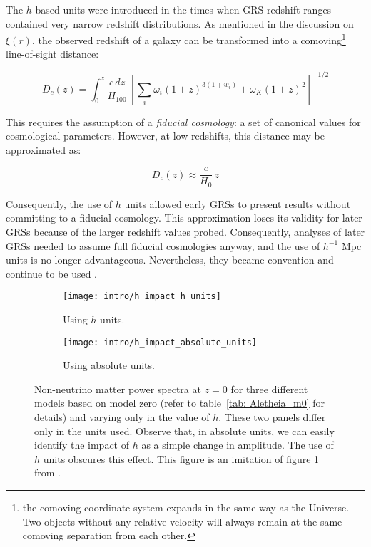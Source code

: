 The $h$-based units were introduced in the times when GRS redshift 
ranges contained very narrow redshift distributions. As mentioned in the
discussion on $\xi(r)$, the observed redshift of a galaxy can be transformed
into a comoving\footnote{the comoving coordinate system expands in the same
way as the Universe. Two objects without any relative velocity will always
remain at the same comoving separation from each other.} line-of-sight 
distance:

\begin{equation}
D_c (z)
=
\int_0^z \frac{c \, dz}{H_{100}}
\,
\left[
	\sum_i \omega_i (1 + z)^{3(1 + w_i)}
	+
	\omega_K (1 + z)^2
\right]^{-1/2}
\end{equation}

This requires the assumption of a \textit{fiducial cosmology}: a set of 
canonical values for cosmological parameters. However, at low
redshifts, this distance may be approximated as:

\begin{equation}
\label{eq: comov_dist_approx}
D_c(z) \approx \frac{c}{H_0} \, z
\end{equation}

Consequently, the use of $h$ units allowed early GRSs to present results
without committing to a fiducial cosmology. This
approximation loses its validity for later GRSs because of the larger redshift
values probed. Consequently, analyses of later GRSs needed to assume full 
fiducial cosmologies anyway, and the use of $h^{-1}$ Mpc units is no longer
advantageous. Nevertheless, they became convention and continue to be used 
.

\begin{figure}[ht!]
    \begin{subfigure}{0.45 \textwidth}
    \centering
 		\texttt{[image: intro/h\_impact\_h\_units]}
 		\caption{Using $h$ units.}
 		\label{fig: h_units}
    \end{subfigure}
    \begin{subfigure}{0.45 \textwidth}
    \centering
 		\texttt{[image: intro/h\_impact\_absolute\_units]}
 		\caption{Using absolute units.}
 		\label{fig: without_h_units}
    \end{subfigure}
        \centering
    \caption[Impact of $h$ on $P(k)$]
    		{Non-neutrino matter power spectra at $z=0$ for three different
    		models based on model zero (refer to table~\ref{tab: Aletheia_m0} 
    		for details) and varying only in the value of $h$. These two
    		panels
    		differ only in the units used. Observe that, in absolute units, we
    		can easily identify the impact of $h$ as a simple change in
    		amplitude. The use of $h$ units obscures this effect. This figure 
    		is an imitation of figure 1 from \citet{San20}.}
    \label{fig: h_unit_Pk}
\end{figure}

